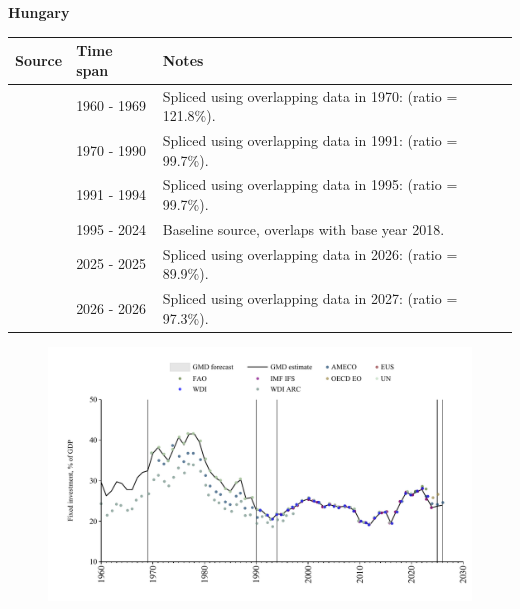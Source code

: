 \documentclass[12pt,a4paper,landscape]{article}
\begin{document}
\begin{adjustbox}{max totalsize={\paperwidth}{\paperheight},center}
\begin{minipage}[t][\textheight][t]{\textwidth}
\vspace*{0.5cm}
{}
\begin{center}
{\Large\bfseries Hungary}
\end{center}
\vspace{0.5cm}
\begin{table}[H]
\centering
\small
\begin{tabular}{|l|l|l|}
\hline
\textbf{Source} & \textbf{Time span} & \textbf{Notes} \\
\hline
\rowcolor{white}\cite{WDI_ARC}& 1960 - 1969 &Spliced using overlapping data in 1970: (ratio = 121.8\%).\\
\rowcolor{lightgray}\cite{UN}& 1970 - 1990 &Spliced using overlapping data in 1991: (ratio = 99.7\%).\\
\rowcolor{white}\cite{WDI}& 1991 - 1994 &Spliced using overlapping data in 1995: (ratio = 99.7\%).\\
\rowcolor{lightgray}\cite{EUS}& 1995 - 2024 &Baseline source, overlaps with base year 2018.\\
\rowcolor{white}\cite{OECD_EO}& 2025 - 2025 &Spliced using overlapping data in 2026: (ratio = 89.9\%).\\
\rowcolor{lightgray}\cite{AMECO}& 2026 - 2026 &Spliced using overlapping data in 2027: (ratio = 97.3\%).\\
\hline
\end{tabular}
\end{table}
\begin{figure}[H]
\centering
\includegraphics[width=\textwidth,height=0.6\textheight,keepaspectratio]{graphs/HUN_finv_GDP.pdf}
\end{figure}
\end{minipage}
\end{adjustbox}
\end{document}
